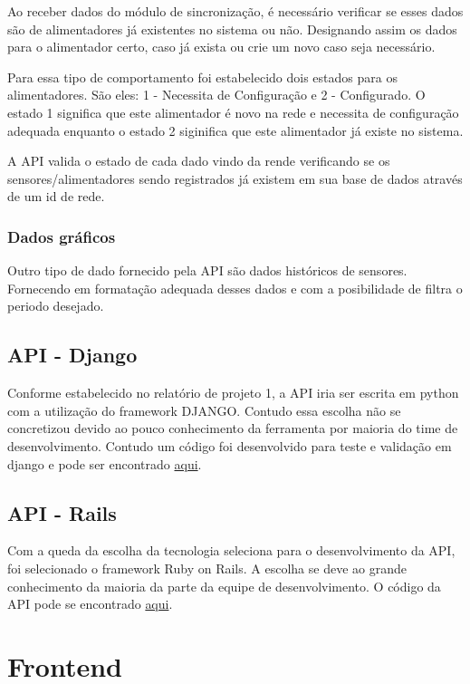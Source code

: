 Ao receber dados do módulo de sincronização, é necessário verificar se esses dados são de alimentadores já existentes no sistema ou não. Designando assim os dados para o alimentador certo, caso já exista ou crie um novo caso seja necessário.

Para essa tipo de comportamento foi estabelecido dois estados para os alimentadores. São eles: 1 - Necessita de Configuração e 2 - Configurado. O estado 1 significa que este alimentador é novo na rede e necessita de configuração adequada enquanto o estado 2 siginifica que este alimentador já existe no sistema.

A API valida o estado de cada dado vindo da rende verificando se os sensores/alimentadores sendo registrados já existem em sua base de dados através de um id de rede.

\subsubsection{Dados gráficos}

Outro tipo de dado fornecido pela API são dados históricos de sensores. Fornecendo em formatação adequada desses dados e com a posibilidade de filtra o periodo desejado.

\subsection{API - Django}

Conforme estabelecido no relatório de projeto 1, a API iria ser escrita em python com a utilização do framework DJANGO. Contudo essa escolha não se concretizou devido ao pouco conhecimento da ferramenta por maioria do time de desenvolvimento. Contudo um código foi desenvolvido para teste e validação em django e pode ser encontrado \href{https://github.com/PI2-Crema/API-django}{aqui}.

\subsection{API - Rails}

Com a queda da escolha da tecnologia seleciona para o desenvolvimento da API, foi selecionado o framework Ruby on Rails. A escolha se deve ao grande conhecimento da maioria da parte da equipe de desenvolvimento. O código da API pode se encontrado \href{https://github.com/PI2-Crema/API-rails}{aqui}.

\section{Frontend}

